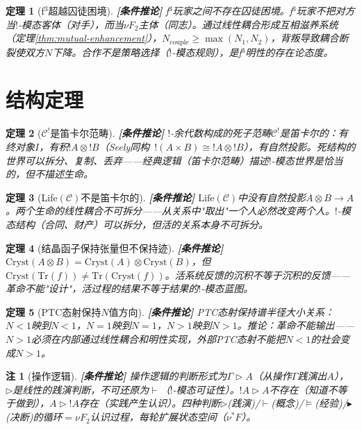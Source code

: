 \documentclass[11pt,a4paper]{article}
\newtheorem{theorem}{定理}
\newtheorem{remark}{注}
\newcommand{\lvl}[1]{\hfill\textbf{\footnotesize[#1]}}
\newcommand{\lvC}{\lvl{条件推论}}
\newcommand{\bang}{{!}}
\begin{document}
\begin{theorem}[f$^3$超越囚徒困境]\label{thm:f3-prisoner}\lvC
f$^3$玩家之间不存在囚徒困境。f$^3$玩家不把对方当$\bang$-模态客体（对手），而当$\nu F_2$主体（同志）。通过线性耦合形成互相滋养系统（定理\ref{thm:mutual-enhancement}），$N_{\mathrm{couple}}\geq\max(N_1,N_2)$，背叛导致耦合断裂使双方$N$下降。合作不是策略选择（$\bang$-模态规则），是f$^3$明性的存在论态度。
\end{theorem}


\section{结构定理}

\begin{theorem}[$\mathcal{C}^!$是笛卡尔范畴]\label{thm:dead-cartesian}\lvC
$\bang$-余代数构成的死子范畴$\mathcal{C}^!$是笛卡尔的：有终对象$I$，有积$\bang A\otimes\bang B$（Seely同构~\cite{seely89}$\bang(A\times B)\cong\bang A\otimes\bang B$），有自然投影。死结构的世界可以拆分、复制、丢弃——经典逻辑（笛卡尔范畴）描述$\bang$-模态世界是恰当的，但不描述生命。
\end{theorem}

\begin{theorem}[Life$(\mathcal{C})$不是笛卡尔的]\label{thm:life-not-cartesian}\lvC
$\mathrm{Life}(\mathcal{C})$中没有自然投影$A\otimes B\to A$。两个生命的线性耦合不可拆分——从关系中"取出"一个人必然改变两个人。$\bang$-模态结构（合同、财产）可以拆分，但活的关系本身不可拆分。
\end{theorem}

\begin{theorem}[结晶函子保持张量但不保持迹]\label{thm:cryst-tensor-trace}\lvC
$\mathrm{Cryst}(A\otimes B)=\mathrm{Cryst}(A)\otimes\mathrm{Cryst}(B)$，但$\mathrm{Cryst}(\mathrm{Tr}(f))\neq\mathrm{Tr}(\mathrm{Cryst}(f))$。活系统反馈的沉积不等于沉积的反馈——革命不能"设计"，活过程的结果不等于结果的$\bang$-模态蓝图。
\end{theorem}

\begin{theorem}[PTC态射保持$N$值方向]\label{thm:ptc-morphism-n}\lvC
PTC态射保持谱半径大小关系：$N<1$映到$N<1$，$N=1$映到$N=1$，$N>1$映到$N>1$。推论：革命不能输出——$N>1$必须在内部通过线性耦合和明性实现，外部PTC态射不能把$N<1$的社会变成$N>1$。
\end{theorem}

\begin{remark}[操作逻辑]\lvC
操作逻辑的判断形式为$\Gamma\triangleright A$（从操作$\Gamma$践演出$A$），$\triangleright$是线性的践演判断，不可还原为$\vdash$（$\bang$-模态可证性）。$\bang A\triangleright A$不存在（知道不等于做到），$A\triangleright\bang A$存在（实践产生认识）。四种判断$\triangleright$(践演)/$\vdash$(概念)/$\models$(经验)/$\blacktriangleright$(决断)的循环$=\nu F_2$认识过程，每轮扩展状态空间（$\nu^*F$）。
\end{remark}
\end{document}
